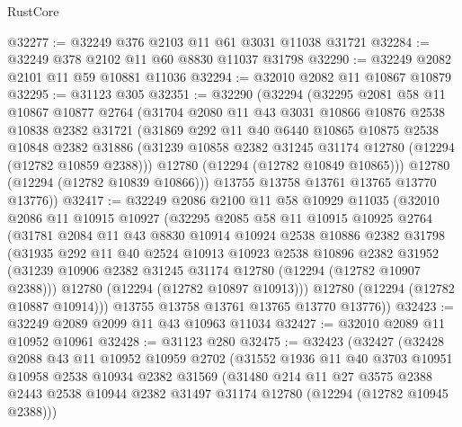 \begin{lexlean}{RustCore}
\begin{coremodule}
@32277 := @32249 @376 @2103 @11 @61 @3031 @11038 @31721
@32284 := @32249 @378 @2102 @11 @60 @8830 @11037 @31798
@32290 := @32249 @2082 @2101 @11 @59 @10881 @11036
@32294 := @32010 @2082 @11 @10867 @10879
@32295 := @31123 @305
@32351 := @32290
    (@32294
      (@32295
        @2081
        @58
        @11
        @10867
        @10877
        @2764
        (@31704
          @2080
          @11
          @43
          @3031
          @10866
          @10876
          @2538
          @10838
          @2382
          @31721
          (@31869
            @292
            @11
            @40
            @6440
            @10865
            @10875
            @2538
            @10848
            @2382
            @31886
            (@31239 @10858 @2382 @31245 @31174 @12780 (@12294 (@12782 @10859 @2388)))
            @12780
            (@12294 (@12782 @10849 @10865)))
          @12780
          (@12294 (@12782 @10839 @10866)))
        @13755
        @13758
        @13761
        @13765
        @13770
        @13776))
@32417 := @32249
    @2086
    @2100
    @11
    @58
    @10929
    @11035
    (@32010
      @2086
      @11
      @10915
      @10927
      (@32295
        @2085
        @58
        @11
        @10915
        @10925
        @2764
        (@31781
          @2084
          @11
          @43
          @8830
          @10914
          @10924
          @2538
          @10886
          @2382
          @31798
          (@31935
            @292
            @11
            @40
            @2524
            @10913
            @10923
            @2538
            @10896
            @2382
            @31952
            (@31239 @10906 @2382 @31245 @31174 @12780 (@12294 (@12782 @10907 @2388)))
            @12780
            (@12294 (@12782 @10897 @10913)))
          @12780
          (@12294 (@12782 @10887 @10914)))
        @13755
        @13758
        @13761
        @13765
        @13770
        @13776))
@32423 := @32249 @2089 @2099 @11 @43 @10963 @11034
@32427 := @32010 @2089 @11 @10952 @10961
@32428 := @31123 @280
@32475 := @32423
    (@32427
      (@32428
        @2088
        @43
        @11
        @10952
        @10959
        @2702
        (@31552
          @1936
          @11
          @40
          @3703
          @10951
          @10958
          @2538
          @10934
          @2382
          @31569
          (@31480
            @214
            @11
            @27
            @3575
            @2388
            @2443
            @2538
            @10944
            @2382
            @31497
            @31174
            @12780
            (@12294 (@12782 @10945 @2388)))

\end{coremodule}
\end{lexlean}
